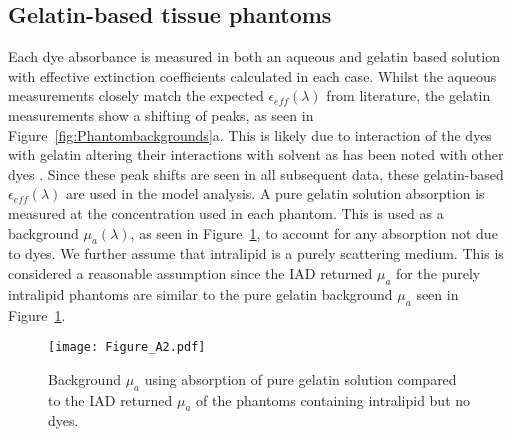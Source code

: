 
\subsection{Gelatin-based tissue phantoms}\label{sec:resultsPhantoms}
Each dye absorbance is measured in both an aqueous and gelatin based solution with effective extinction coefficients calculated in each case. Whilst the aqueous measurements closely match the expected $\epsilon_{eff}(\lambda)$ from literature\cite{PhotochemCAD}, the gelatin measurements show a shifting of peaks, as seen in Figure~\ref{fig:Phantombackgrounds}a. This is likely due to interaction of the dyes with gelatin altering their interactions with solvent as has been noted with other dyes \cite{Cook2011}.
Since these peak shifts are seen in all subsequent data, these gelatin-based $\epsilon_{eff}(\lambda)$ are used in the model analysis. A pure gelatin solution absorption is measured at the concentration used in each phantom. This is used as a background $\mu_a(\lambda)$, as seen in Figure~\ref{fig:muaback}, to account for any absorption not due to dyes.
We further assume that intralipid is a purely scattering medium. This is considered a reasonable assumption since the IAD returned $\mu_a$ for the purely intralipid phantoms are similar to the pure gelatin background $\mu_a$ seen in Figure~\ref{fig:muaback}.

\begin{figure}[htb!]
    \centering
    \texttt{[image: Figure\_A2.pdf]}
    \caption{Background $\mu_a$ using absorption of pure gelatin solution compared to the IAD returned $\mu_a$ of the phantoms containing intralipid but no dyes.}
 \label{fig:muaback}
\end{figure}

